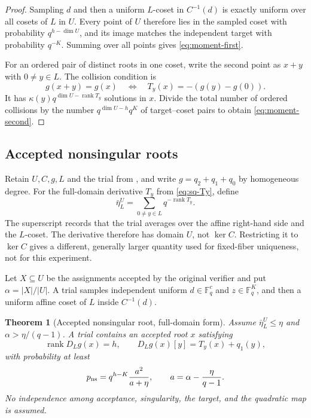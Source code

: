 \documentclass[11pt]{article}
\newtheorem{theorem}{Theorem}[section]
\newcommand{\F}{\mathbb F}
\newcommand{\rank}{\operatorname{rank}}
\begin{document}
\begin{proof}
Sampling $d$ and then a uniform $L$-coset in $C^{-1}(d)$ is exactly uniform
over all cosets of $L$ in $U$.  Every point of $U$ therefore lies in the
sampled coset with probability $q^{h-\dim U}$, and its image matches the
independent target with probability $q^{-K}$.  Summing over all points gives
\eqref{eq:moment-first}.

For an ordered pair of distinct roots in one coset, write the second point as
$x+y$ with $0\ne y\in L$.  The collision condition is
\[
 g(x+y)=g(x)
 \quad\Longleftrightarrow\quad
 T_y(x)=-(g(y)-g(0)).
\]
It has $\kappa(y)q^{\dim U-\rank T_y}$ solutions in $x$.  Divide the total
number of ordered collisions by the number
$q^{\dim U-h}q^K$ of target--coset pairs to obtain
\eqref{eq:moment-second}.
\end{proof}

\subsection{Accepted nonsingular roots}

Retain $U,C,g,L$ and the trial from , and write
$g=q_2+q_1+q_0$ by homogeneous degree.  For the full-domain derivative $T_y$
from \eqref{eq:sq-Ty}, define
\begin{equation}
 \bar\eta_L^U=\sum_{0\ne y\in L}q^{-\rank T_y}. \label{eq:sq-etaU}
\end{equation}
The superscript records that the trial averages over the affine right-hand side
and the $L$-coset.  The derivative therefore has domain $U$, not $\ker C$.
Restricting it to $\ker C$ gives a different, generally larger quantity used
for fixed-fiber uniqueness, not for this experiment.

Let $X\subseteq U$ be the assignments accepted by the original verifier and
put $\alpha=|X|/|U|$.  A trial samples independent uniform
$d\in\F_q^c$ and $z\in\F_q^K$, and then a uniform affine coset of $L$ inside
$C^{-1}(d)$.

\begin{theorem}[Accepted nonsingular root, full-domain form]
\label{thm:sq-accepted-root}
Assume $\bar\eta_L^U\le\eta$ and
$\alpha>\eta/(q-1)$.  A trial contains an accepted root $x$ satisfying
\[
 \rank D_Lg(x)=h,
 \qquad
 D_Lg(x)[y]=T_y(x)+q_1(y),
\]
with probability at least
\begin{equation}
 p_{\rm ns}
 =q^{h-K}\frac{a^2}{a+\eta},
 \qquad a=\alpha-\frac{\eta}{q-1}.
 \label{eq:sq-pns}
\end{equation}
No independence among acceptance, singularity, the target, and the quadratic
map is assumed.
\end{theorem}
\end{document}
